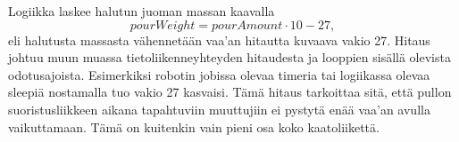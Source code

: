 Logiikka laskee halutun juoman massan kaavalla
\[pourWeight = pourAmount \cdot 10  - 27, \]
eli halutusta massasta vähennetään vaa'an hitautta kuvaava vakio 27. Hitaus johtuu muun muassa tietoliikenneyhteyden hitaudesta ja looppien sisällä olevista odotusajoista. Esimerkiksi robotin jobissa olevaa timeria tai logiikassa olevaa sleepiä nostamalla tuo vakio 27 kasvaisi. Tämä hitaus tarkoittaa sitä, että pullon suoristusliikkeen aikana tapahtuviin muuttujiin ei pystytä enää vaa'an avulla vaikuttamaan. Tämä on kuitenkin vain pieni osa koko kaatoliikettä.
